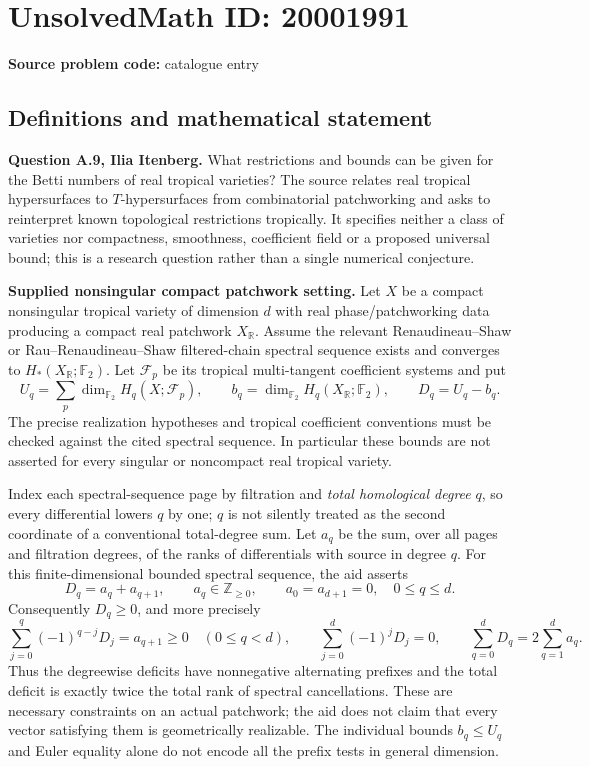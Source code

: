 \documentclass[11pt]{article}
\newcommand{\Z}{\mathbb{Z}}
\newcommand{\R}{\mathbb{R}}
\newcommand{\F}{\mathbb{F}}
\begin{document}
\section*{UnsolvedMath ID: 20001991}
\textbf{Source problem code:} catalogue entry
\subsection{Definitions and mathematical statement}
\textbf{Question A.9, Ilia Itenberg.} What restrictions and bounds can be given for the Betti numbers of real tropical varieties? The source relates real tropical hypersurfaces to $T$-hypersurfaces from combinatorial patchworking and asks to reinterpret known topological restrictions tropically. It specifies neither a class of varieties nor compactness, smoothness, coefficient field or a proposed universal bound; this is a research question rather than a single numerical conjecture.

\textbf{Supplied nonsingular compact patchwork setting.} Let $X$ be a compact nonsingular tropical variety of dimension $d$ with real phase/patchworking data producing a compact real patchwork $X_{\R}$. Assume the relevant Renaudineau--Shaw or Rau--Renaudineau--Shaw filtered-chain spectral sequence exists and converges to $H_*(X_{\R};\F_2)$. Let $\mathcal F_p$ be its tropical multi-tangent coefficient systems and put
\[
 U_q=\sum_p\dim_{\F_2}H_q(X;\mathcal F_p),\qquad
 b_q=\dim_{\F_2}H_q(X_{\R};\F_2),\qquad D_q=U_q-b_q.
\]
The precise realization hypotheses and tropical coefficient conventions must be checked against the cited spectral sequence. In particular these bounds are not asserted for every singular or noncompact real tropical variety.

Index each spectral-sequence page by filtration and \emph{total homological degree} $q$, so every differential lowers $q$ by one; $q$ is not silently treated as the second coordinate of a conventional total-degree sum. Let $a_q$ be the sum, over all pages and filtration degrees, of the ranks of differentials with source in degree $q$. For this finite-dimensional bounded spectral sequence, the aid asserts
\[
 D_q=a_q+a_{q+1},\qquad a_q\in\Z_{\ge0},\qquad
 a_0=a_{d+1}=0,\quad 0\le q\le d.
\]
Consequently $D_q\ge0$, and more precisely
\[
 \sum_{j=0}^q(-1)^{q-j}D_j=a_{q+1}\ge0
 \quad(0\le q<d),\qquad
 \sum_{j=0}^d(-1)^jD_j=0,
 \qquad \sum_{q=0}^dD_q=2\sum_{q=1}^d a_q.
\]
Thus the degreewise deficits have nonnegative alternating prefixes and the total deficit is exactly twice the total rank of spectral cancellations. These are necessary constraints on an actual patchwork; the aid does not claim that every vector satisfying them is geometrically realizable. The individual bounds $b_q\le U_q$ and Euler equality alone do not encode all the prefix tests in general dimension.
\end{document}
